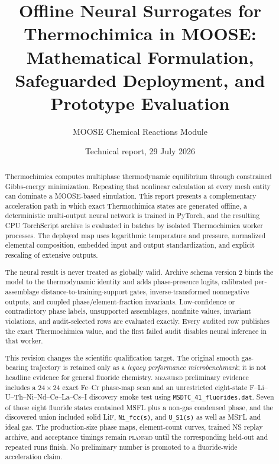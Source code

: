\documentclass[11pt]{article}
\title{Offline Neural Surrogates for Thermochimica in MOOSE:\\
Mathematical Formulation, Safeguarded Deployment, and Prototype Evaluation}
\author{MOOSE Chemical Reactions Module}
\date{Technical report, 29 July 2026}
\newcommand{\code}[1]{\texttt{#1}}
\newcommand{\measured}{\textsc{measured}}
\newcommand{\planned}{\textsc{planned}}
\begin{document}
\maketitle

\begin{abstract}
Thermochimica computes multiphase thermodynamic equilibrium through constrained Gibbs-energy
minimization.  Repeating that nonlinear calculation at every mesh entity can dominate a
MOOSE-based simulation.  This report presents a complementary acceleration path in which exact
Thermochimica states are generated offline, a deterministic multi-output neural network is trained
in PyTorch, and the resulting CPU TorchScript archive is evaluated in batches by isolated
Thermochimica worker processes.  The deployed map uses logarithmic temperature and pressure,
normalized elemental composition, embedded input and output standardization, and explicit
rescaling of extensive outputs.

The neural result is never treated as globally valid.  Archive schema version 2 binds the model
to the thermodynamic identity and adds phase-presence logits, calibrated per-assemblage
distance-to-training-support gates, inverse-transformed nonnegative outputs, and coupled
phase/element-fraction invariants.  Low-confidence or contradictory phase labels, unsupported
assemblages, nonfinite values, invariant violations, and audit-selected rows are evaluated
exactly.  Every audited row publishes the exact Thermochimica value, and the first failed audit
disables neural inference in that worker.

This revision changes the scientific qualification target.  The original smooth gas-bearing
trajectory is retained only as a \emph{legacy performance microbenchmark}; it is not headline
evidence for general fluoride chemistry.  \measured{} preliminary evidence includes a
\(24\times24\) exact Fe--Cr phase-map scan and an unrestricted eight-state
F--Li--U--Th--Ni--Nd--Ce--La--Cs--I discovery smoke test using
\code{MSDTC\_41\_fluorides.dat}.  Seven of those eight fluoride states contained MSFL plus a
non-gas condensed phase, and the discovered union included solid LiF, \code{Ni\_fcc(s)}, and
\code{U\_S1(s)} as well as MSFL and ideal gas.  The production-size phase maps, element-count
curves, trained NS replay archive, and acceptance timings remain \planned{} until the corresponding
held-out and repeated runs finish.  No preliminary number is promoted to a fluoride-wide
acceleration claim.
\end{abstract}
\end{document}
